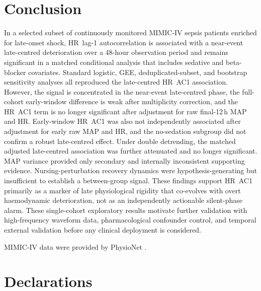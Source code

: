 \documentclass[referee,lineno,pdflatex]{sn-article-template/sn-jnl}
\begin{document}
\section{Conclusion}
\label{sec:conclusion}

In a selected subset of continuously monitored MIMIC-IV sepsis patients enriched for
late-onset shock, HR~lag-1 autocorrelation is associated with a near-event late-centred
deterioration over a 48-hour observation period and remains significant in a matched conditional analysis
that includes sedative and beta-blocker covariates.
Standard logistic, GEE, deduplicated-subset, and bootstrap sensitivity analyses all
reproduced the late-centred HR~AC1 association.
However, the signal is concentrated in the near-event late-centred phase, the full-cohort
early-window difference is weak after multiplicity correction, and the HR~AC1 term is no
longer significant after adjustment for raw final-12\,h MAP and HR.
Early-window HR~AC1 was also not independently associated after adjustment for early raw
MAP and HR, and the no-sedation subgroup did not confirm a robust late-centred effect.
Under double detrending, the matched adjusted late-centred association was further
attenuated and no longer significant.
MAP variance provided only secondary and internally inconsistent supporting evidence.
Nursing-perturbation recovery dynamics were hypothesis-generating but insufficient
to establish a between-group signal.
These findings support HR~AC1 primarily as a marker of late physiological rigidity that
co-evolves with overt haemodynamic deterioration, not as an independently actionable
silent-phase alarm.
These single-cohort exploratory results motivate further validation with
high-frequency waveform data, pharmacological confounder control,
and temporal external validation before any clinical deployment is considered.

\backmatter

MIMIC-IV data were provided by PhysioNet \cite{goldberger2000}.

\section*{Declarations}
\end{document}
